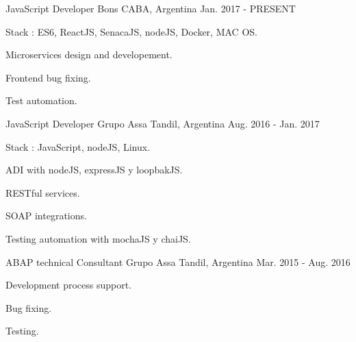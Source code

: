 


\begin{cventries}

\cventry
{ JavaScript Developer} %
{Bons} %
{CABA, Argentina} %
{Jan. 2017 - PRESENT} %
{ %
\begin{cvitems}
\item {Stack : ES6, ReactJS, SenacaJS, nodeJS, Docker, MAC OS.}
\item {Microservices design and developement.}
\item {Frontend bug fixing.}
\item {Test automation.}
\end{cvitems}
}
\cventry
{ JavaScript Developer} %
{Grupo Assa} %
{Tandil, Argentina} %
{Aug. 2016 - Jan. 2017} %
{ %
\begin{cvitems}
\item {Stack : JavaScript, nodeJS, Linux.}
\item {ADI with nodeJS, expressJS y loopbakJS.}
\item {RESTful services.}
\item {SOAP integrations.}
\item {Testing automation with mochaJS y chaiJS.}
\end{cvitems}
}

\cventry
{ABAP technical Consultant} %
{Grupo Assa} %
{Tandil, Argentina} %
{Mar. 2015 - Aug. 2016} %
{ %
\begin{cvitems}
\item {Development process support.}
\item {Bug fixing.}
\item {Testing.}
\end{cvitems}
}



\end{cventries}

